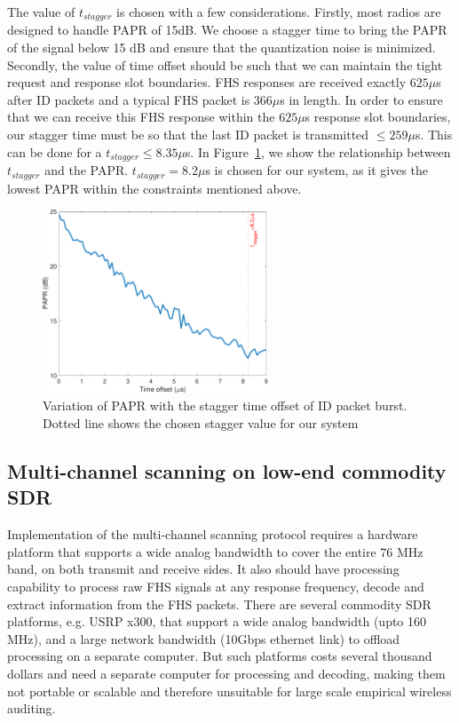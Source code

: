 The value of $t_{stagger}$ is chosen with a few considerations. 
%
Firstly, most radios are designed to handle PAPR of 15dB. 
%
We choose a stagger time to bring the PAPR of the signal below 15 dB and ensure that the quantization noise is minimized. 
%
Secondly, the value of time offset should be such that we can maintain the tight request and response slot boundaries.
%
FHS responses are received exactly $625\mu$s after ID packets and a typical FHS packet is $366\mu$s in length.
%
In order to ensure that we can receive this FHS response within the $625\mu$s response slot boundaries, our stagger time must be so that the last ID packet is transmitted $\leq259\mu$s.
%
This can be done for a $t_{stagger}\leq8.35\mu$s.
In Figure~\ref{fig:hyperscanner:papr_stagger}, we show the relationship between $t_{stagger}$ and the PAPR. 
%
$t_{stagger}=8.2 \mu$s is chosen for our system, as it gives the lowest PAPR within the constraints mentioned above.
%
\begin{figure}[h!]
    \centering
    \captionsetup{justification=centering}
    \includegraphics[width=0.6\textwidth]{hyperscanner/plots/papr_stagger.pdf}
    \caption{Variation of PAPR with the stagger time offset of ID packet burst. Dotted line shows the chosen stagger value for our system}
    \label{fig:hyperscanner:papr_stagger}
\end{figure}

\subsection{Multi-channel scanning on low-end commodity SDR}
Implementation of the multi-channel scanning protocol requires a hardware platform that supports a wide analog bandwidth to cover the entire 76 MHz band, on both transmit and receive sides.
%
It also should have processing capability to process raw FHS signals at any response frequency, decode and extract information from the FHS packets.
%
There are several commodity SDR platforms, e.g. USRP x300, that support a wide analog bandwidth (upto 160 MHz), and a large network bandwidth (10Gbps ethernet link) to offload processing on a separate computer. 
%
But such platforms costs several thousand dollars and need a separate computer for processing and decoding, making them not portable or scalable and therefore unsuitable for large scale empirical wireless auditing.

